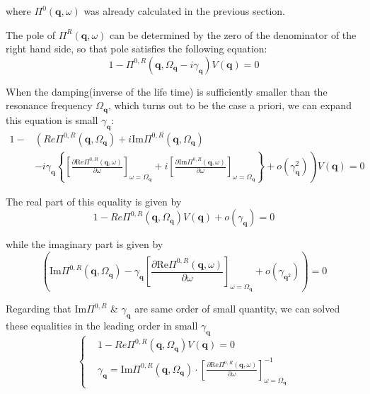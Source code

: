 where $\Pi^0(\mathbf{q},\omega)$ was already calculated in the previous section.

The pole of $\Pi^R(\mathbf{q},\omega)$ can be determined by the zero of the denominator of the right hand side, so that pole satisfies the following equation:
\begin{equation} \label{Eqs3.2.8}
1-\Pi^{0,R}(\mathbf{q},\Omega_{\mathbf{q}}-i \gamma_{\mathbf{q}})V(\mathbf{q}) = 0
\end{equation}

When the damping(inverse of the life time) is sufficiently smaller than the resonance frequency $\Omega_{\mathbf{q}}$, which turns out to be the case a priori, we can expand this equation is small $\gamma_{\mathbf{q}}$:
\begin{equation} \label{Eqs3.2.9} \begin{split}
1-&\left( Re\Pi^{0,R}(\mathbf{q},\Omega_{\mathbf{q}}) + i \text{Im} \Pi^{0,R}(\mathbf{q},\Omega_{\mathbf{q}}) \right.\\
&\left. -i \gamma_{\mathbf{q}} \left\{ \left[ \frac{\partial \text{Re} \Pi^{0,R}(\mathbf{q},\omega)}{\partial \omega} \right]_{\omega=\Omega_{\mathbf{q}}} + i \left[ \frac{\partial \text{Im} \Pi^{0,R}(\mathbf{q},\omega)}{\partial \omega} \right]_{\omega=\Omega_{\mathbf{q}}} \right\} + o(\gamma_{\mathbf{q}}^2) \right)V(\mathbf{q}) = 0
\end{split}\end{equation}

The real part of this equality is given by
\begin{equation} \label{Eqs3.2.10}
1- Re\Pi^{0,R}(\mathbf{q},\Omega_{\mathbf{q}}) V(\mathbf{q}) + o(\gamma_{\mathbf{q}}) = 0
\end{equation}

while the imaginary part is given by
\begin{equation} \label{Eqs3.2.11}
\left( \text{Im} \Pi^{0,R}(\mathbf{q},\Omega_{\mathbf{q}}) - \gamma_{\mathbf{q}} \left[ \frac{\partial \text{Re} \Pi^{0,R}(\mathbf{q},\omega)}{\partial \omega} \right]_{\omega=\Omega_{\mathbf{q}}} + o(\gamma_{\mathbf{q}^2}) \right) = 0
\end{equation}

Regarding that $\text{Im} \Pi^{0,R}$ \& $\gamma_{\mathbf{q}}$ are same order of small quantity, we can solved these equalities in the leading order in small $\gamma_{\mathbf{q}}$
\begin{equation} \label{Eqs3.2.12}
\left\{ \begin{split}
&1- Re\Pi^{0,R}(\mathbf{q},\Omega_{\mathbf{q}}) V(\mathbf{q}) = 0\\
&\gamma_{\mathbf{q}} = \text{Im} \Pi^{0,R}(\mathbf{q},\Omega_{\mathbf{q}}) \cdot 
 \left[ \frac{\partial \text{Re} \Pi^{0,R}(\mathbf{q},\omega)}{\partial \omega} \right]_{\omega=\Omega_{\mathbf{q}}}^{-1}
\end{split} \right.
\end{equation}

